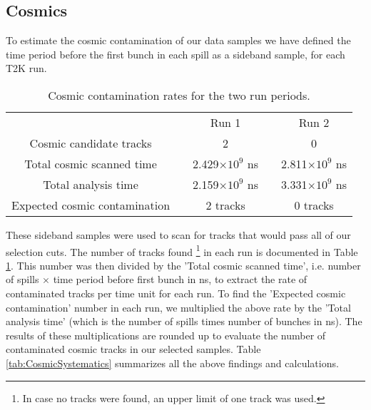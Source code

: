 \subsection{Cosmics}
\label{sec:Systematics_Cosmics}

To estimate the cosmic contamination of our data samples 
we have defined the time period before the first bunch in each spill 
as a sideband sample, 
for each T2K run. \\

\begin{table}[h]
\centering
\begin{tabular}{ccccc}
\toprule
   & & Run 1& & Run 2\\
\cline{3-3}\cline{5-5} 
Cosmic candidate tracks& & 2 & & 0 \\
\hline 
Total cosmic scanned time & & 2.429$\times 10^9$ ns & & 2.811$\times 10^9$ ns \\
\hline 
Total analysis time & & 2.159$\times 10^9$ ns & & 3.331$\times 10^9$ ns \\
\hline 
Expected cosmic contamination & & 2 tracks & & 0 tracks \\
\bottomrule
\end{tabular} 
\caption{Cosmic contamination rates for the two run periods.}
\label{tab:CosmicsStudy}
\end{table}

These sideband samples were used to scan for tracks that would 
pass all of our selection cuts. 
The number of tracks found \footnote{In case no tracks were found, 
an upper limit of one track was used.} in each run is documented 
in Table \ref{tab:CosmicsStudy}. 
This number was then divided by the 'Total cosmic scanned time', 
i.e. number of spills $\times$ time period before first bunch in ns, 
to extract the rate of contaminated tracks per time unit for each run. 
To find the 'Expected cosmic contamination' number in each run, 
we multiplied the above rate by the 'Total analysis time' 
(which is the number of spills times number of bunches 
in ns). 
The results of these multiplications are rounded up 
to evaluate the number of contaminated cosmic tracks in our 
selected samples. 
Table \ref{tab:CosmicSystematics} 
summarizes all the above findings and calculations. \\

